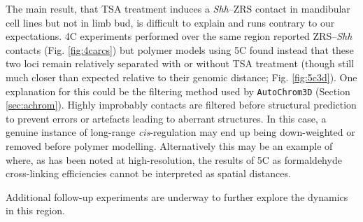 \documentclass[a4paper,11pt,oneside]{book}
\begin{document}
The main result, that TSA treatment induces a \emph{Shh}--ZRS contact in mandibular cell lines but not in limb bud, is difficult to explain and runs contrary to our expectations. 4C experiments performed over the same region reported ZRS--\emph{Shh} contacts (Fig. \ref{fig:4carcs}) but polymer models using 5C found instead that these two loci remain relatively separated with or without TSA treatment (though still much closer than expected relative to their genomic distance; Fig. \ref{fig:5c3d}). One explanation for this could be the filtering method used by \texttt{AutoChrom3D} (Section \ref{sec:achrom}). Highly improbably contacts are filtered before structural prediction to prevent errors or artefacts leading to aberrant structures. In this case, a genuine instance of long-range \emph{cis}-regulation may end up being down-weighted or removed before polymer modelling. Alternatively this may be an example of where, as has been noted at high-resolution, the results of 5C as formaldehyde cross-linking efficiencies cannot be interpreted as spatial distances.\cite{Williamson2014}



Additional follow-up experiments are underway to further explore the dynamics in this region.




\ifstandalone
\begin{small}

\end{small}
\fi
\end{document}
